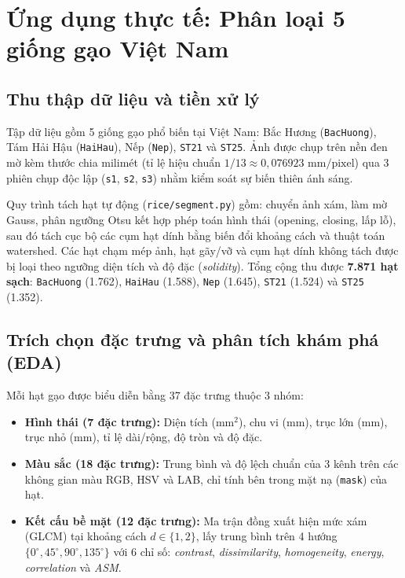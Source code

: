 \section{Ứng dụng thực tế: Phân loại 5 giống gạo Việt Nam}

\subsection{Thu thập dữ liệu và tiền xử lý}
Tập dữ liệu gồm 5 giống gạo phổ biến tại Việt Nam: Bắc Hương (\texttt{BacHuong}), Tám Hải Hậu (\texttt{HaiHau}), Nếp (\texttt{Nep}), \texttt{ST21} và \texttt{ST25}. Ảnh được chụp trên nền đen mờ kèm thước chia milimét (tỉ lệ hiệu chuẩn $1/13 \approx 0{,}076923\text{ mm/pixel}$) qua 3 phiên chụp độc lập (\texttt{s1}, \texttt{s2}, \texttt{s3}) nhằm kiểm soát sự biến thiên ánh sáng.

Quy trình tách hạt tự động (\texttt{rice/segment.py}) gồm: chuyển ảnh xám, làm mờ Gauss, phân ngưỡng Otsu kết hợp phép toán hình thái (opening, closing, lấp lỗ), sau đó tách cục bộ các cụm hạt dính bằng biến đổi khoảng cách và thuật toán watershed. Các hạt chạm mép ảnh, hạt gãy/vỡ và cụm hạt dính không tách được bị loại theo ngưỡng diện tích và độ đặc (\textit{solidity}). Tổng cộng thu được \textbf{7.871 hạt sạch}: \texttt{BacHuong} (1.762), \texttt{HaiHau} (1.588), \texttt{Nep} (1.645), \texttt{ST21} (1.524) và \texttt{ST25} (1.352).

\subsection{Trích chọn đặc trưng và phân tích khám phá (EDA)}
Mỗi hạt gạo được biểu diễn bằng 37 đặc trưng thuộc 3 nhóm:
\begin{itemize}
    \item \textbf{Hình thái (7 đặc trưng):} Diện tích ($\text{mm}^2$), chu vi ($\text{mm}$), trục lớn ($\text{mm}$), trục nhỏ ($\text{mm}$), tỉ lệ dài/rộng, độ tròn và độ đặc.
    \item \textbf{Màu sắc (18 đặc trưng):} Trung bình và độ lệch chuẩn của 3 kênh trên các không gian màu RGB, HSV và LAB, chỉ tính bên trong mặt nạ (\texttt{mask}) của hạt.
    \item \textbf{Kết cấu bề mặt (12 đặc trưng):} Ma trận đồng xuất hiện mức xám (GLCM) tại khoảng cách $d \in \{1, 2\}$, lấy trung bình trên 4 hướng $\{0^\circ, 45^\circ, 90^\circ, 135^\circ\}$ với 6 chỉ số: \textit{contrast}, \textit{dissimilarity}, \textit{homogeneity}, \textit{energy}, \textit{correlation} và \textit{ASM}.
\end{itemize}

